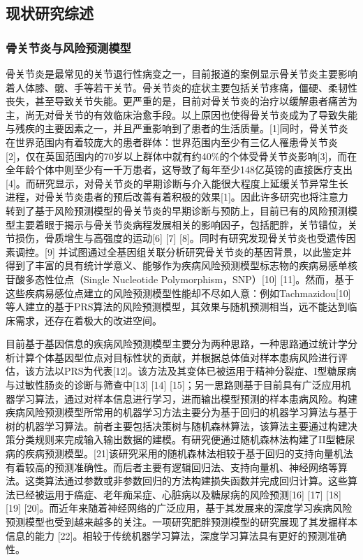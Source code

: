 \documentclass[
]{article}
\begin{document}
\hypertarget{ux73b0ux72b6ux7814ux7a76ux7efcux8ff0}{%
\subsection{现状研究综述}\label{ux73b0ux72b6ux7814ux7a76ux7efcux8ff0}}

\hypertarget{ux9aa8ux5173ux8282ux708eux4e0eux98ceux9669ux9884ux6d4bux6a21ux578b}{%
\subsubsection{骨关节炎与风险预测模型}\label{ux9aa8ux5173ux8282ux708eux4e0eux98ceux9669ux9884ux6d4bux6a21ux578b}}

骨关节炎是最常见的关节退行性病变之一，目前报道的案例显示骨关节炎主要影响着人体膝、髋、手等若干关节。骨关节炎的症状主要包括关节疼痛，僵硬、柔韧性丧失，甚至导致关节失能。更严重的是，目前对骨关节炎的治疗以缓解患者痛苦为主，尚无对骨关节的有效临床治愈手段。以上原因也使得骨关节炎成为了导致失能与残疾的主要因素之一，并且严重影响到了患者的生活质量。{[}1{]}同时，骨关节炎在世界范围内有着较庞大的患者群体：世界范围内至少有三亿人罹患骨关节炎{[}2{]}，仅在英国范围内的70岁以上群体中就有约40\%的个体受骨关节炎影响{[}3{]}，而在全年龄个体中则至少有一千万患者，这导致了每年至少148亿英镑的直接医疗支出{[}4{]}。而研究显示，对骨关节炎的早期诊断与介入能很大程度上延缓关节异常生长进程，对骨关节炎患者的预后改善有着积极的效果{[}1{]}。因此许多研究也将注意力转到了基于风险预测模型的骨关节炎的早期诊断与预防上，目前已有的风险预测模型主要着眼于揭示与骨关节炎病程发展相关的影响因子，包括肥胖，关节错位，关节损伤，骨质增生与高强度的运动{[}6{]}
{[}7{]} {[}8{]}。同时有研究发现骨关节炎也受遗传因素调控。{[}9{]}
并试图通过全基因组关联分析研究骨关节炎的基因背景，以此鉴定并得到了丰富的具有统计学意义、能够作为疾病风险预测模型标志物的疾病易感单核苷酸多态性位点（Single
Nucleotide Polymorphism，SNP）{[}10{]}
{[}11{]}。然而，基于这些疾病易感位点建立的风险预测模型性能却不尽如人意：例如Tachmazidou{[}10{]}等人建立的基于PRS算法的风险预测模型，其效果与随机预测相当，远不能达到临床需求，还存在着极大的改进空间。

目前基于基因信息的疾病风险预测模型主要分为两种思路，一种思路通过统计学分析计算个体基因型位点对目标性状的贡献，并根据总体值对样本患病风险进行评估，该方法以PRS为代表{[}12{]}。该方法及其变体已被运用于精神分裂症、I型糖尿病与过敏性肠炎的诊断与筛查中{[}13{]}
{[}14{]}
{[}15{]}；另一思路则基于目前具有广泛应用机器学习算法，通过对样本信息进行学习，进而输出模型预测的样本患病风险。构建疾病风险预测模型所常用的机器学习方法主要分为基于回归的机器学习算法与基于树的机器学习算法。前者主要包括决策树与随机森林算法，该算法主要通过构建决策分类规则来完成输入输出数据的建模。有研究便通过随机森林法构建了II型糖尿病的疾病预测模型。{[}21{]}该研究采用的随机森林法相较于基于回归的支持向量机法有着较高的预测准确性。而后者主要有逻辑回归法、支持向量机、神经网络等算法。这类算法通过参数或非参数回归的方法构建损失函数并完成回归计算。这些算法已经被运用于癌症、老年痴呆症、心脏病以及糖尿病的风险预测{[}16{]}
{[}17{]} {[}18{]} {[}19{]}
{[}20{]}。而近年来随着神经网络的广泛应用，基于其发展来的深度学习疾病风险预测模型也受到越来越多的关注。一项研究肥胖预测模型的研究展现了其发掘样本信息的能力
{[}22{]}。相较于传统机器学习算法，深度学习算法具有更好的预测准确性。
\end{document}
